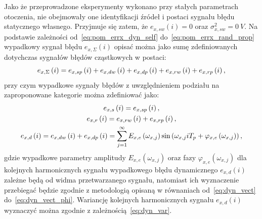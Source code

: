 Jako że przeprowadzone eksperymenty wykonano przy stałych parametrach otoczenia, nie obejmowały one identyfikacji źródeł i postaci sygnału błędu statycznego własnego. Przyjmuje się zatem, że $e_{x,sw}(i) = 0$ oraz $\sigma_{x,sw}^{2} = \qty{0}{V}$. Na podstawie zależności od~\eqref{eq:pom_errx_dyn_self} do~\eqref{eq:pom_errx_rand_prop} wypadkowy sygnał błędu $e_{x,\Sigma}(i)$ opisać można jako sumę zdefiniowanych dotychczas sygnałów błędów cząstkowych w postaci:
\begin{equation}
e_{x,\Sigma} \left(i\right) = e_{x,sp} \left(i\right) + e_{x,dw} \left(i\right) + e_{x,dp} \left(i\right) + e_{x,rw} \left(i\right) + e_{x,rp} \left(i\right) \label{eq:pom_errx_sum},
\end{equation}
przy czym wypadkowe sygnały błędów z uwzględnieniem podziału na zaproponowane kategorie można zdefiniować jako:
\begin{gather}
e_{x,s} \left(i\right) = e_{x,sp} \left(i\right) \label{eq:pom_errx_stat}, \\
e_{x,r} \left(i\right) = e_{x,rw} \left(i\right) + e_{x,rp} \left(i\right) \label{eq:pom_errx_rand}, \\
e_{x,d} \left(i\right) = e_{x,dw} \left(i\right) + e_{x,dp} \left(i\right) = \sum _{j=1} ^{\infty} E_{x,e} \left(\omega_{x,j}\right) \sin \left(\omega_{x,j} iT_{p} + \varphi_{x,e} \left(\omega_{x,j}\right)\right) \label{eq:pom_errx_dyn},
\end{gather}
gdzie wypadkowe parametry amplitudy $E_{x,e}(\omega_{x,j})$ oraz fazy $\varphi_{x,e}(\omega_{x,j})$ dla kolejnych harmonicznych sygnału wypadkowego błędu dynamicznego $e_{x,d}(i)$ zależne będą od widma przetwarzanego sygnału, natomiast ich wyznaczenie przebiegać będzie zgodnie z metodologią opisaną w równaniach od~\eqref{eq:dyn_vect} do~\eqref{eq:dyn_vect_phi}. Wariancję kolejnych harmonicznych sygnału $e_{x,d}(i)$ wyznaczyć można zgodnie z zależnością~\eqref{eq:dyn_var}.

